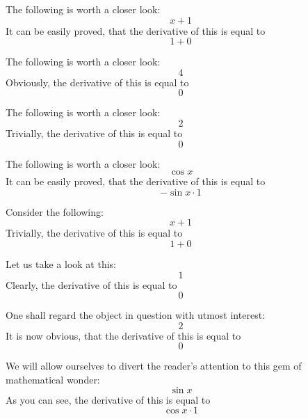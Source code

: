 \documentclass{article}
\begin{document}
The following is worth a closer look:
\begin{equation}
x + 1 
\end{equation}
It can be easily proved, that the derivative of this is equal to
\begin{equation}
1 + 0 
\end{equation}

The following is worth a closer look:
\begin{equation}
4 
\end{equation}
Obviously, the derivative of this is equal to
\begin{equation}
0 
\end{equation}

The following is worth a closer look:
\begin{equation}
2 
\end{equation}
Trivially, the derivative of this is equal to
\begin{equation}
0 
\end{equation}

The following is worth a closer look:
\begin{equation}
\cos x 
\end{equation}
It can be easily proved, that the derivative of this is equal to
\begin{equation}
-\sin x \cdot 1 
\end{equation}

Consider the following:
\begin{equation}
x + 1 
\end{equation}
Trivially, the derivative of this is equal to
\begin{equation}
1 + 0 
\end{equation}

Let us take a look at this:
\begin{equation}
1 
\end{equation}
Clearly, the derivative of this is equal to
\begin{equation}
0 
\end{equation}

One shall regard the object in question with utmost interest:
\begin{equation}
2 
\end{equation}
It is now obvious, that the derivative of this is equal to
\begin{equation}
0 
\end{equation}

We will allow ourselves to divert the reader's attention to this gem of mathematical wonder:
\begin{equation}
\sin x 
\end{equation}
As you can see, the derivative of this is equal to
\begin{equation}
\cos x \cdot 1 
\end{equation}
\end{document}
